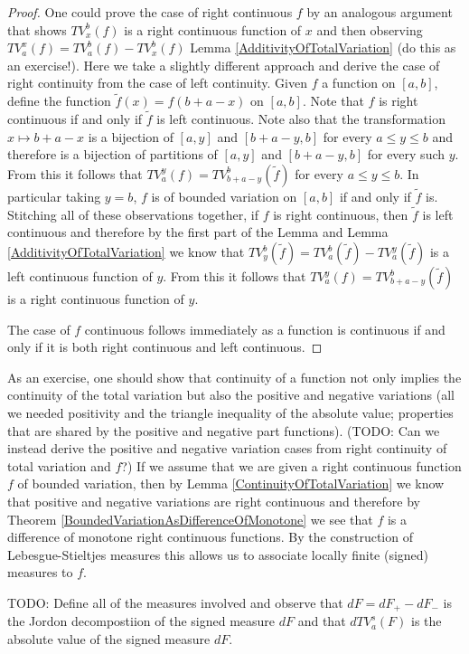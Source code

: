 \documentclass{amsart}
\theoremstyle{remark}
\theoremstyle{definition}
\begin{document}
\begin{proof}
One could prove the case of right continuous $f$ by an analogous
argument that shows $TV_x^b(f)$ is a right continuous function of $x$
and then observing $TV_a^x(f) = TV_a^b(f) - TV_x^b(f)$ Lemma
\ref{AdditivityOfTotalVariation} (do this as an exercise!).  Here we take a slightly different
approach and derive the case of right continuity from the case of left
continuity.  Given $f$ a function on $[a,b]$, define the function
$\tilde{f}(x) = f(b+a-x)$ on $[a,b]$.  Note that $f$ is right
continuous if and only if $\tilde{f}$ is left continuous.  Note also
that the transformation $x \mapsto b+a-x$ is a bijection of $[a,y]$
and $[b+a-y,b]$ for every $a \leq y \leq b$
and therefore is a bijection of partitions of $[a,y]$ and $[b+a-y,b]$
for every such $y$.  From this it follows that $TV_a^y(f) =
TV_{b+a-y}^b(\tilde{f})$ for every $a \leq y \leq b$.  In particular
taking $y=b$,
$f$ is of bounded variation on $[a,b]$ if and only if $\tilde{f}$ is.
Stitching all of these observations together, if $f$ is right
continuous, then $\tilde{f}$ is left continuous and therefore by the
first part of the Lemma and Lemma \ref{AdditivityOfTotalVariation} we
know that $TV_{y}^b(\tilde{f}) = TV_a^b(\tilde{f}) -
TV_a^{y} (\tilde{f})$ is a left continuous function of $y$.  From this
it follows that $TV_a^y(f) = TV_{b+a-y}^b(\tilde{f})$ is a right
continuous function of $y$.

The case of $f$ continuous follows immediately as a function is
continuous if and only if it is both right continuous and left continuous.
\end{proof}

As an exercise, one should show that continuity of a function not only
implies the continuity of the total variation but also the positive
and negative variations (all we needed positivity and the triangle
inequality of the absolute value; properties that are shared by the
positive and negative part functions).  (TODO: Can we instead derive the
positive and negative variation cases from right continuity of total
variation and $f$?)
If we assume that we are given a right continuous function $f$ of bounded
variation, then by Lemma \ref{ContinuityOfTotalVariation} we know that
positive and negative variations are right continuous and therefore by
Theorem \ref{BoundedVariationAsDifferenceOfMonotone} we see that $f$
is a difference of monotone right continuous functions.  By the
construction of Lebesgue-Stieltjes measures this allows us to
associate locally finite (signed) measures to $f$.  

TODO: Define all of the measures involved and observe that $dF = dF_+ - dF_-$
is the Jordon decompostiion of the signed measure $dF$ and that $dTV_a^s(F)$ is the
absolute value of the signed measure $dF$.
\end{document}
